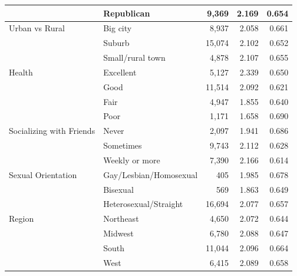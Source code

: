 \begin{table}[htbp]
\begin{tabular}{llrrr}
 & Republican & 9,369 & 2.169 & 0.654 \\
\midrule
Urban vs Rural & Big city & 8,937 & 2.058 & 0.661 \\
 & Suburb & 15,074 & 2.102 & 0.652 \\
 & Small/rural town & 4,878 & 2.107 & 0.655 \\
\midrule
Health & Excellent & 5,127 & 2.339 & 0.650 \\
 & Good & 11,514 & 2.092 & 0.621 \\
 & Fair & 4,947 & 1.855 & 0.640 \\
 & Poor & 1,171 & 1.658 & 0.690 \\
\midrule
Socializing with Friends & Never & 2,097 & 1.941 & 0.686 \\
 & Sometimes & 9,743 & 2.112 & 0.628 \\
 & Weekly or more & 7,390 & 2.166 & 0.614 \\
\midrule
Sexual Orientation & Gay/Lesbian/Homosexual & 405 & 1.985 & 0.678 \\
 & Bisexual & 569 & 1.863 & 0.649 \\
 & Heterosexual/Straight & 16,694 & 2.077 & 0.657 \\
\midrule
Region & Northeast & 4,650 & 2.072 & 0.644 \\
 & Midwest & 6,780 & 2.088 & 0.647 \\
 & South & 11,044 & 2.096 & 0.664 \\
 & West & 6,415 & 2.089 & 0.658 \\
\bottomrule
\end{tabular}
\end{table}
